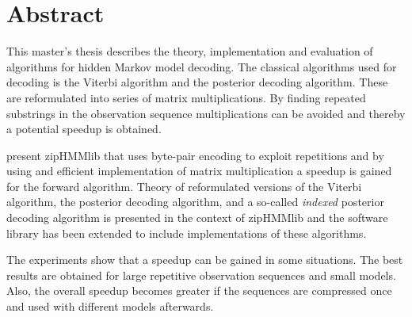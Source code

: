 \chapter{Abstract}

This master's thesis describes the theory, implementation and evaluation of
algorithms for hidden Markov model decoding. The classical algorithms used
for decoding is the Viterbi algorithm and the posterior decoding algorithm.
These are reformulated into series of matrix multiplications. By finding
repeated substrings in the observation sequence multiplications can be
avoided and thereby a potential speedup is obtained.

\citet{sand2013ziphmmlib} present zipHMMlib that uses byte-pair encoding to
exploit repetitions and by using and efficient implementation of matrix
multiplication a speedup is gained for the forward algorithm. Theory of
reformulated versions of the Viterbi algorithm, the posterior decoding
algorithm, and a so-called \emph{indexed} posterior decoding algorithm is
presented in the context of zipHMMlib and the software library has been
extended to include implementations of these algorithms.

The experiments show that a speedup can be gained in some situations. The
best results are obtained for large repetitive observation sequences and
small models. Also, the overall speedup becomes greater if the sequences are
compressed once and used with different models afterwards.
